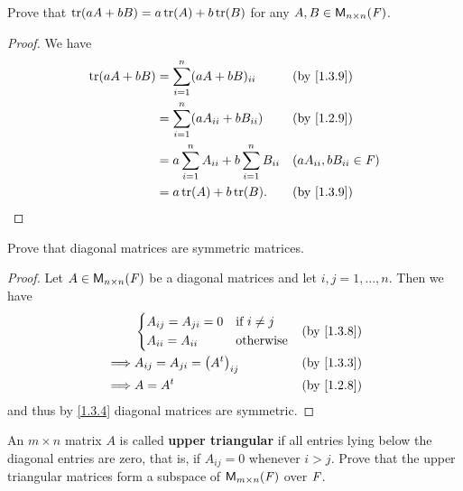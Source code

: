 \begin{ex}\label{ex:1.3.6}
  Prove that \(\tr{aA + bB} = a\tr{A} + b\tr{B}\) for any \(A, B \in \mathsf{M}_{{n} \times n}({\mathit{F}})\).
\end{ex}

\begin{proof}
  We have
  \begin{align*}
    \tr{aA + bB} & = \sum_{i = 1}^{n} (aA + bB)_{i i}                        &  & \text{(by \cref{1.3.9})}    \\
                 & = \sum_{i = 1}^{n} \p{aA_{i i} + bB_{i i}}                &  & \text{(by \cref{1.2.9})}    \\
                 & = a \sum_{i = 1}^{n} A_{i i} + b \sum_{i = 1}^{n} B_{i i} &  & (aA_{i i}, bB_{i i} \in \F) \\
                 & = a\tr{A} + b\tr{B}.                                      &  & \text{(by \cref{1.3.9})}
  \end{align*}
\end{proof}

\begin{ex}\label{ex:1.3.7}
  Prove that diagonal matrices are symmetric matrices.
\end{ex}

\begin{proof}
  Let \(A \in \mathsf{M}_{{n} \times n}({\mathit{F}})\) be a diagonal matrices and let \(i, j = 1, \dots, n\).
  Then we have
  \begin{align*}
             & \begin{dcases}
      A_{i j} = A_{j i} = 0 & \text{if } i \neq j \\
      A_{i i} = A_{i i}     & \text{otherwise}
    \end{dcases}           &  & \text{(by \cref{1.3.8})} \\
    \implies & A_{i j} = A_{j i} = \p{\tp{A}}_{i j} &  & \text{(by \cref{1.3.3})} \\
    \implies & A = \tp{A}                           &  & \text{(by \cref{1.2.8})}
  \end{align*}
  and thus by \cref{1.3.4} diagonal matrices are symmetric.
\end{proof}

\setcounter{ex}{11}
\begin{ex}\label{ex:1.3.12}
  An \(m \times n\) matrix \(A\) is called \textbf{upper triangular} if all entries lying below the diagonal entries are zero, that is, if \(A_{i j} = 0\) whenever \(i > j\).
  Prove that the upper triangular matrices form a subspace of \(\mathsf{M}_{{m} \times n}({\mathit{F}})\) over \(\mathit{F}\).
\end{ex}

